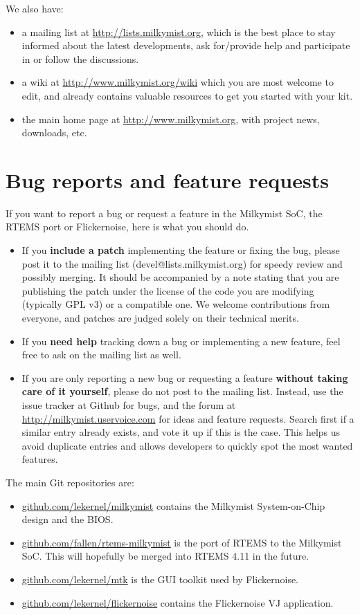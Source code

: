 \documentclass{leaflet}
\begin{document}
We also have:
\begin{itemize}
\item a mailing list at \url{http://lists.milkymist.org}, which is the best place to stay informed about the latest developments, ask for/provide help and participate in or follow the discussions.
\item a wiki at \url{http://www.milkymist.org/wiki} which you are most welcome to edit, and already contains valuable resources to get you started with your kit.
\item the main home page at \url{http://www.milkymist.org}, with project news, downloads, etc.
\end{itemize}

\section{Bug reports and feature requests}
If you want to report a bug or request a feature in the Milkymist SoC, the RTEMS port or Flickernoise, here is what you should do.
\begin{itemize}
\item If you \textbf{include a patch} implementing the feature or fixing the bug, please post it to the mailing list (devel@lists.milkymist.org) for speedy review and possibly merging. It should be accompanied by a note stating that you are publishing the patch under the license of the code you are modifying (typically GPL v3) or a compatible one. We welcome contributions from everyone, and patches are judged solely on their technical merits.
\item If you \textbf{need help} tracking down a bug or implementing a new feature, feel free to ask on the mailing list as well.
\item If you are only reporting a new bug or requesting a feature \textbf{without taking care of it yourself}, please do not post to the mailing list. Instead, use the issue tracker at Github for bugs, and the forum at \url{http://milkymist.uservoice.com} for ideas and feature requests. Search first if a similar entry already exists, and vote it up if this is the case. This helps us avoid duplicate entries and allows developers to quickly spot the most wanted features.
\end{itemize}

The main Git repositories are:
\begin{itemize}
\item \url{github.com/lekernel/milkymist} contains the Milkymist System-on-Chip design and the BIOS.
\item \url{github.com/fallen/rtems-milkymist} is the port of RTEMS to the Milkymist SoC. This will hopefully be merged into RTEMS 4.11 in the future.
\item \url{github.com/lekernel/mtk} is the GUI toolkit used by Flickernoise.
\item \url{github.com/lekernel/flickernoise} contains the Flickernoise VJ application.
\end{itemize}
\end{document}
